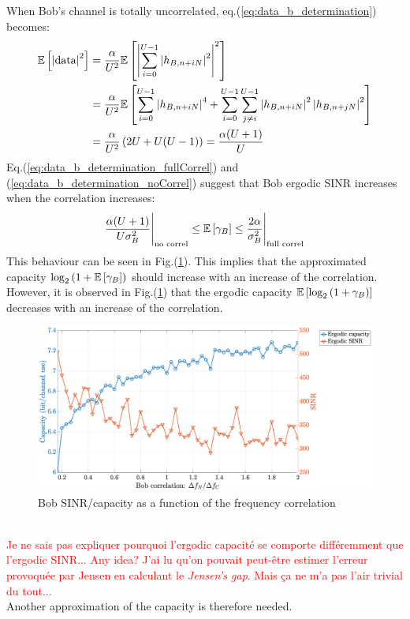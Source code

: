 \documentclass[12pt]{article}
\begin{document}
When Bob's channel is totally uncorrelated, eq.(\ref{eq:data_b_determination}) becomes:
\begin{equation}
\begin{split}
\mathbb{E} \left[\left| \text{data}\right|^2\right] &=  \frac{\alpha}{U^2} \mathbb{E} \left[\left|\sum_{i=0}^{U-1} \left|h_{B,n+iN}\right|^2\right|^2\right] \\
&=  \frac{\alpha}{U^2} \mathbb{E} \left[\sum_{i=0}^{U-1} \left|h_{B,n+iN}\right|^4  + \sum_{i=0}^{U-1}\sum_{j \neq i}^{U-1} \left|h_{B,n+iN}\right|^2  \left|h_{B,n+jN}\right|^2 \right] \\
&=  \frac{\alpha}{U^2} \left(2U + U(U-1) \right)= \frac{\alpha(U+1)}{U}
\label{eq:data_b_determination_noCorrel}
\end{split}
\end{equation}
Eq.(\ref{eq:data_b_determination_fullCorrel}) and (\ref{eq:data_b_determination_noCorrel}) suggest that Bob ergodic SINR increases when the correlation increases:
\begin{equation}
	\frac{\alpha(U+1)}{U \sigma_B^2}\Bigg|_{\text{no correl}} \leq \mathbb{E} \left[\gamma_B\right] \leq \frac{2\alpha}{\sigma_B^2}\Bigg|_{\text{full correl}}
\end{equation}
This behaviour can be seen in Fig.(\ref{fig:sinr_capa_variableCorrelB}). This implies that the approximated capacity $\log_2{(1+\mathbb{E} \left[\gamma_B\right])}$ should increase with an increase of the correlation. However, it is observed in Fig.(\ref{fig:sinr_capa_variableCorrelB}) that the ergodic capacity $\mathbb{E} \left[\log_2{(1+\gamma_B)}\right]$ decreases with an increase of the correlation.
\begin{figure}[htb!]
	\centering
	\includegraphics[width=.75\linewidth]{img/SINR_capa_variableCorrelB.eps}
	\caption{Bob SINR/capacity as a function of the frequency  correlation}
	\label{fig:sinr_capa_variableCorrelB}
\end{figure}\\
\textcolor{red}{Je ne sais pas expliquer pourquoi l'ergodic capacité se comporte différemment que l'ergodic SINR... Any idea? J'ai lu qu'on pouvait peut-être estimer l'erreur provoquée par Jensen en calculant le \textit{Jensen's gap}. Mais ça ne m'a pas l'air trivial du tout...}\\
Another approximation of the capacity is therefore needed.
\end{document}
